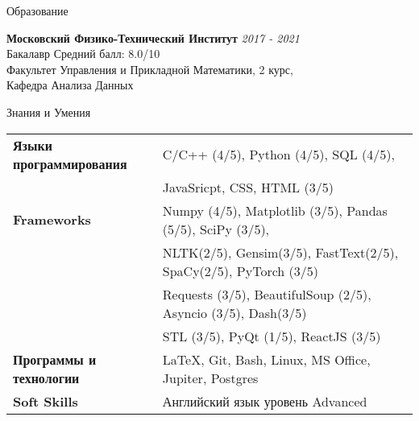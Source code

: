 \documentclass{resume} %
\begin{document}

\begin{rSection}{Образование}

{\bf Московский Физико-Технический Институт} \hfill {\em 2017 - 2021} 
\\ Бакалавр \hfill { Средний балл: 8.0/10}
\\ Факультет Управления и Прикладной Математики, 2 курс, \\Кафедра Анализа Данных


\end{rSection}

\begin{rSection}{Знания и Умения}

\begin{tabular}{ @{} >{\bfseries}l @{\hspace{6ex}} l }
Языки программирования &  C/C++ (4/5), Python (4/5),  SQL  (4/5),  \\																				   &JavaSricpt, CSS, HTML (3/5) \\
Frameworks & Numpy (4/5), Matplotlib (3/5), Pandas (5/5), SciPy (3/5), \\ 
					& NLTK(2/5), Gensim(3/5), FastText(2/5), SpaCy(2/5), PyTorch (3/5)\\ 
					&  Requests (3/5), BeautifulSoup (2/5), Asyncio (3/5), Dash(3/5) \\
					& STL (3/5), PyQt (1/5), ReactJS (3/5)\\
Программы и технологии & LaTeX, Git, Bash, Linux, MS Office, Jupiter, Postgres \\
Soft Skills & Английский язык уровень Advanced
\end{tabular}

\end{rSection}

\end{document}
